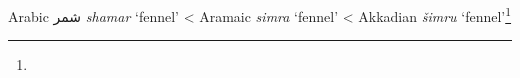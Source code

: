 \begin{etymology}\label{ety:shamar}
Arabic { شمر} \textit{shamar} `fennel'
< Aramaic \textit{simra} `fennel'
< Akkadian {} \textit{šimru} `fennel'\footnote{}
\end{etymology}